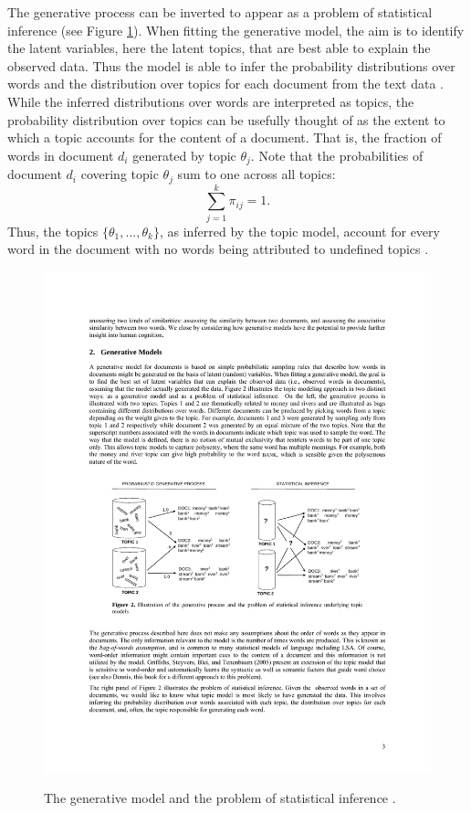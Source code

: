 \documentclass[11pt,a4paper,english,oneside]{book}
\numberwithin{equation}{chapter}
\begin{document}
The generative process can be inverted to appear as a problem of statistical inference (see Figure \ref{genproc}). When fitting the generative model, the aim is to identify the latent variables, here the latent topics, that are best able to explain the observed data. Thus the model is able to infer the probability distributions over words and the distribution over topics for each document from the text data \cite[~p. 3]{Steyvers(2007)}. While the inferred distributions over words are interpreted as topics, the probability distribution over topics can be usefully thought of as the extent to which a topic accounts for the content of a document. That is, the fraction of words in document $d_i$ generated by topic $\theta_j$. Note that the probabilities of document $d_i$ covering topic $\theta_{j}$ sum to one across all topics:
$$
\sum_{j=1}^{k} \pi_{ij} = 1.
$$
Thus, the topics $\{\theta_1, ..., \theta_k\}$, as inferred by the topic model, account for every word in the document with no words being attributed to undefined topics \cite[pp.~338]{Zhai.2016}. 

\begin{figure}
	\caption{The generative model and the problem of statistical inference \cite[p.3]{Steyvers(2007)}.}
	\centering
	\includegraphics[scale=1]{Images/genproc.pdf}
	\label{genproc}
\end{figure}
\end{document}

